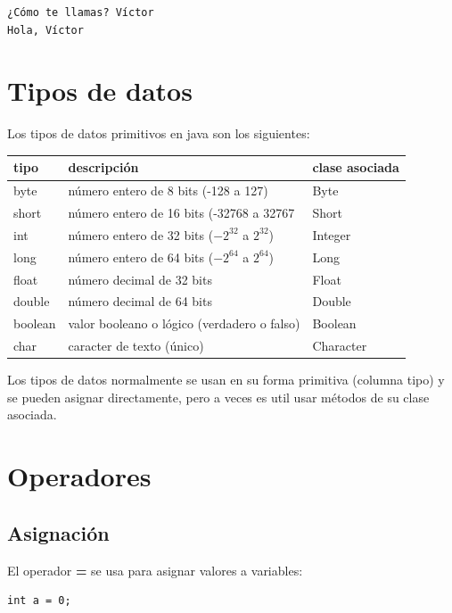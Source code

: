 \documentclass[11pt]{article}
\begin{document}
\begin{verbatim}
¿Cómo te llamas? Víctor
Hola, Víctor
\end{verbatim}

\section{Tipos de datos}
\label{sec:org8a1a611}
Los tipos de datos primitivos en java son los siguientes:
\begin{center}
\begin{tabular}{lll}
tipo & descripción & clase asociada\\
\hline
byte & número entero de 8 bits (-128 a 127) & Byte\\
short & número entero de 16 bits (-32768 a 32767 & Short\\
int & número entero de 32 bits (\(-2^{32}\) a \(2^{32}\)) & Integer\\
long & número entero de 64 bits (\(-2^{64}\) a \(2^{64}\)) & Long\\
float & número decimal de 32 bits & Float\\
double & número decimal de 64 bits & Double\\
boolean & valor booleano o lógico (verdadero o falso) & Boolean\\
char & caracter de texto (único) & Character\\
\end{tabular}
\end{center}


Los tipos de datos normalmente se usan en su forma primitiva (columna tipo) y se pueden asignar directamente, pero a veces es util usar métodos de su clase asociada.
\section{Operadores}
\label{sec:org5a36d62}
\subsection{Asignación}
\label{sec:orgda5e19e}
El operador \textbf{=} se usa para asignar valores a variables:
\begin{verbatim}
int a = 0;
\end{verbatim}
\end{document}
